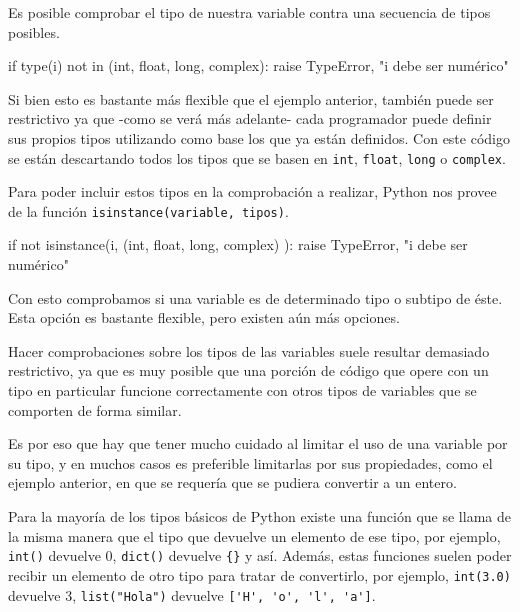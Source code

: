 Es posible comprobar el tipo de nuestra variable contra una secuencia de
tipos posibles.

\begin{codigo-python-sn}
if type(i) not in (int, float, long, complex):
	raise TypeError, "i debe ser numérico"
\end{codigo-python-sn}

Si bien esto es bastante más flexible que el ejemplo anterior, también puede
ser restrictivo ya que -como se verá más adelante- cada programador puede
definir sus propios tipos utilizando como base los que ya están definidos.
Con este código se están descartando todos los tipos que se basen en
\lstinline!int!, \lstinline!float!,
\lstinline!long! o \lstinline!complex!. 

Para poder incluir estos tipos en la comprobación a realizar, Python nos
provee de la función \lstinline!isinstance(variable, tipos)!.

\begin{codigo-python-sn}
if not isinstance(i, (int, float, long, complex) ):
	raise TypeError, "i debe ser numérico"
\end{codigo-python-sn}

Con esto comprobamos si una variable es de determinado tipo o subtipo de
éste. Esta opción es bastante flexible, pero existen aún más opciones.

\begin{atencion}
Hacer comprobaciones sobre los tipos de las variables suele resultar
demasiado restrictivo, ya que es muy posible que una porción de código que
opere con un tipo en particular funcione correctamente con otros tipos de
variables que se comporten de forma similar.

Es por eso que hay que tener mucho cuidado al limitar el uso de una
variable por su tipo, y en muchos casos es preferible limitarlas por sus
propiedades, como el ejemplo anterior, en que se requería que se pudiera
convertir a un entero.
\end{atencion}

Para la mayoría de los tipos básicos de Python existe una función que se
llama de la misma manera que el tipo que devuelve un elemento de ese tipo,
por ejemplo, \lstinline!int()! devuelve 0, \lstinline!dict()! devuelve
\lstinline!{}! y así. Además, estas funciones suelen poder recibir un
elemento de otro tipo para tratar de convertirlo, por ejemplo,
\lstinline!int(3.0)! devuelve 3, \lstinline!list("Hola")! devuelve
\lstinline!['H', 'o', 'l', 'a']!.

